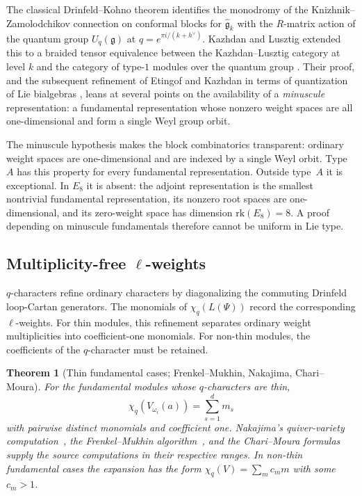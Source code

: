 \documentclass[11pt,reqno]{amsart}
\newtheorem{theorem}{Theorem}[section]
\theoremstyle{definition}
\theoremstyle{remark}
\newcommand{\fg}{\mathfrak{g}}
\numberwithin{equation}{section}
\begin{document}
The classical Drinfeld--Kohno theorem \cite{Kohno87, Drinfeld90}
identifies the monodromy of the Knizhnik--Zamolodchikov
connection on conformal blocks for $\widehat{\fg}_k$ with the
$R$-matrix action of the quantum group
$U_q(\fg)$ at $q = e^{\pi i / (k + h^\vee)}$.
Kazhdan and Lusztig extended this to a braided tensor equivalence
between the Kazhdan--Lusztig category at level $k$ and the
category of type-$1$ modules over the quantum group
\cite{KL93a, KL93b, KL94a, KL94b}. Their proof, and the subsequent
refinement of Etingof and Kazhdan in terms of quantization of Lie
bialgebras \cite{EK96, EK98}, leans at several points on the
availability of a \emph{minuscule} representation: a fundamental
representation whose nonzero weight spaces are all one-dimensional
and form a single Weyl group orbit.

The minuscule hypothesis makes the block combinatorics transparent:
ordinary weight spaces are one-dimensional and are indexed by a
single Weyl orbit. Type~$A$ has this property for every fundamental
representation. Outside type~$A$ it is exceptional. In $E_8$ it is
absent: the adjoint representation is the smallest nontrivial
fundamental representation, its nonzero root spaces are
one-dimensional, and its zero-weight space has dimension
$\mathrm{rk}(E_8)=8$. A proof depending on minuscule fundamentals
therefore cannot be uniform in Lie type.

\subsection{Multiplicity-free $\ell$-weights}

\(q\)-characters refine ordinary characters by diagonalizing the
commuting Drinfeld loop-Cartan generators. The monomials of
\(\chi_q(L(\Psi))\) record the corresponding \(\ell\)-weights. For
thin modules, this refinement separates ordinary weight
multiplicities into coefficient-one monomials. For non-thin modules,
the coefficients of the \(q\)-character must be retained.

\begin{theorem}[Thin fundamental cases; Frenkel--Mukhin, Nakajima, Chari--Moura]
\label{thm:chari-moura-intro}
For the fundamental modules whose \(q\)-characters are thin,
\[
  \chi_q(V_{\omega_i}(a))=\sum_{s=1}^d m_s
\]
with pairwise distinct monomials and coefficient one. Nakajima's
quiver-variety computation~\cite{Nakajima04}, the
Frenkel--Mukhin algorithm~\cite{FrenkelMukhin01}, and the
Chari--Moura formulas~\cite{ChariMoura06} supply the source
computations in their respective ranges. In non-thin fundamental
cases the expansion has the form \(\chi_q(V)=\sum_m c_m m\) with
some \(c_m>1\).
\end{theorem}
\end{document}
